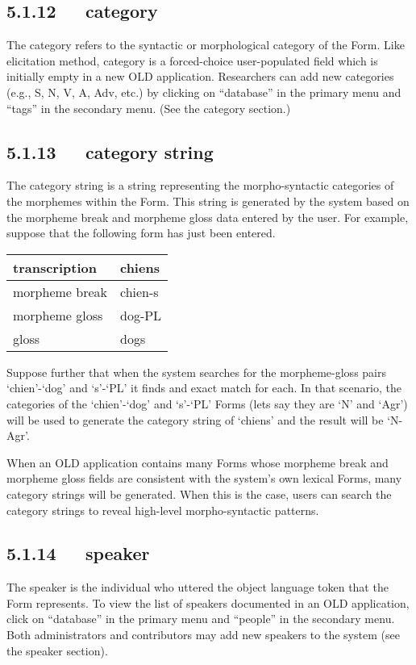 \documentclass[letterpaper,10pt,english]{sphinxmanual}
\begin{document}
\subsection{5.1.12   category}
\label{user_guide:category}
The category refers to the syntactic or morphological category of the Form.
Like elicitation method, category is a forced-choice user-populated field which
is initially empty in a new OLD application.  Researchers can add new categories
(e.g., S, N, V, A, Adv, etc.) by clicking on ``database'' in the primary menu and
``tags'' in the secondary menu.  (See the category section.)


\subsection{5.1.13   category string}
\label{user_guide:category-string}
The category string is a string representing the morpho-syntactic categories of
the morphemes within the Form.  This string is generated by the system based on
the morpheme break and morpheme gloss data entered by the user.  For example,
suppose that the following form has just been entered.

\begin{tabulary}{\linewidth}{|L|L|}
\hline

transcription
 & 
chiens
\\\hline

morpheme break
 & 
chien-s
\\\hline

morpheme gloss
 & 
dog-PL
\\\hline

gloss
 & 
dogs
\\\hline
\end{tabulary}


Suppose further that when the system searches for the morpheme-gloss pairs
`chien'-`dog' and `s'-`PL' it finds and exact match for each.  In that scenario,
the categories of the `chien'-`dog' and `s'-`PL' Forms (lets say they are `N'
and `Agr') will be used to generate the category string of `chiens' and the
result will be `N-Agr'.

When an OLD application contains many Forms whose morpheme break and morpheme
gloss fields are consistent with the system's own lexical Forms, many category
strings will be generated.  When this is the case, users can search the category
strings to reveal high-level morpho-syntactic patterns.


\subsection{5.1.14   speaker}
\label{user_guide:speaker}
The speaker is the individual who uttered the object language token that the
Form represents.  To view the list of speakers documented in an OLD application,
click on ``database'' in the primary menu and ``people'' in the secondary menu.
Both administrators and contributors may add new speakers to the system (see the
speaker section).
\end{document}
